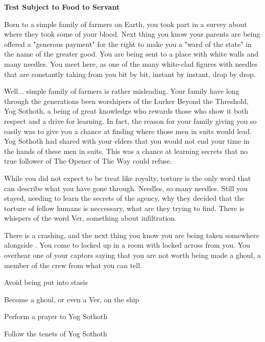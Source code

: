 \documentclass[char]{guildcamp4}
\begin{document}
\name{\cPlead{}}

\begin{center}{\bf Test Subject to Food to Servant}\end{center}

Born to a simple family of farmers on Earth, you took part in a survey about where they took some of your blood. Next thing you know your parents are being offered a "generous payment" for the right to make you a "ward of the state" in the name of the greater good. You are being sent to a place with white walls and many needles. You meet \cSpite{}  here, as one of the many white-clad figures with needles that are constantly taking from you bit by bit, instant by instant, drop by drop. 

Well... simple family of farmers is rather misleading. Your family have long through the generations been worshipers of the Lurker Beyond the Threshold, Yog Sothoth, a being of great knowledge who rewards those who show it both respect and a drive for learning. In fact, the reason for your family giving you so easily was to give you a chance at finding where those men in suits would lead. Yog Sothoth had shared with your elders that you would not end your time in the hands of these men in suits. This was a chance at learning secrets that no true follower of The Opener of The Way could refuse. 

While you did not expect to be treat like royalty, torture is the only word that can describe what you have gone through. Needles, so many needles. Still you stayed, needing to learn the secrets of the agency, why they decided that the torture of fellow humans is neccessary, what are they trying to find. There is whispers of the word Ver, something about infiltration.

There is a crashing, and the next thing you know you are being taken somewhere alongside \cSpite{}. You come to locked up in a room with \cSpite{} locked across from you. You overhear one of your captors saying that you are not worth being made a ghoul, a member of the crew from what you can tell.

\begin{itemz}[Goals]
	\item Avoid being put into stasis
	\item Become a ghoul, or even a Ver, on the ship
	\item Perform a prayer to Yog Sothoth
	\item Follow the tenets of Yog Sothoth
\end{itemz}

\begin{itemz}[Notes]
	\item 
\end{itemz}

\end{document}
